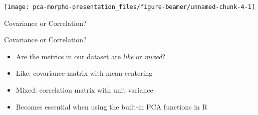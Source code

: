 \documentclass[ignorenonframetext,]{beamer}
\providecommand{\tightlist}{%
  \setlength{\itemsep}{0pt}\setlength{\parskip}{0pt}}
\begin{document}
\begin{frame}{}
\protect\hypertarget{section-1}{}

\begin{center}\texttt{[image: pca-morpho-presentation\_files/figure-beamer/unnamed-chunk-4-1]} \end{center}

\end{frame}

\begin{frame}{Covariance or Correlation?}
\protect\hypertarget{covariance-or-correlation}{}

\begin{block}{Covariance or Correlation?}

\begin{itemize}
\tightlist
\item
  Are the metrics in our dataset are \emph{like} or \emph{mixed}?
\item
  Like: covariance matrix with mean-centering
\item
  Mixed: correlation matrix with unit variance
\item
  Becomes essential when using the built-in PCA functions in R
\end{itemize}

\end{block}

\end{frame}
\end{document}
